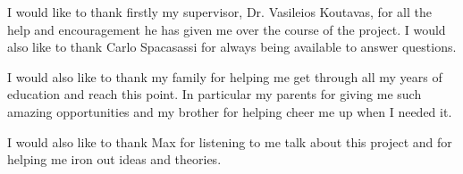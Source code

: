 
\begin{thesisacknowledgments}                     %
I would like to thank firstly my supervisor, Dr. Vasileios Koutavas, for all the help and encouragement he has given me over the course of the project. I would also like to thank Carlo Spacasassi for always being available to answer questions. 

I would also like to thank my family for helping me get through all my years of education and reach this point. In particular my parents for giving me such amazing opportunities and my brother for helping cheer me up when I needed it. 

I would also like to thank Max for listening to me talk about this project and for helping me iron out ideas and theories.                           %
\end{thesisacknowledgments}                       %